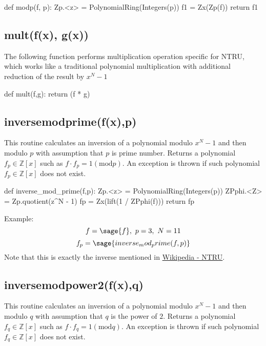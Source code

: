 \documentclass{article}
\begin{document}
\begin{sageblock}
def modp(f, p):
    Zp.<z> = PolynomialRing(Integers(p))
    f1 = Zx(Zp(f))
    return f1
\end{sageblock}


\subsection{mult(f(x), g(x))}
The following function performs multiplication operation specific for NTRU, which works like a traditional polynomial multiplication with additional reduction of the result by $x^N-1$
\begin{sageblock}
def mult(f,g):
    return (f * g) %
\end{sageblock}



\subsection{inverse\textunderscore mod\textunderscore prime(f(x),p)}
This routine calculates an inversion of a polynomial modulo $x^N-1$ 
and then modulo $p$ with assumption that $p$ is prime number.
Returns a polynomial $f_p\in\mathbb{Z}[x]$ such as $f\cdot f_p = 1(\mathrm{mod} p).$
An exception is thrown if such polynomial $f_p\in\mathbb{Z}[x]$ does not exist.



\begin{sageblock}
def inverse_mod_prime(f,p):
    Zp.<z> = PolynomialRing(Integers(p))
    ZPphi.<Z> = Zp.quotient(z^N - 1)
    fp = Zx(lift(1 / ZPphi(f)))
    return fp
\end{sageblock}


Example:
\[
f=\sage{f}, \ p=3, \ N=11
\]
\[
f_p=\sage{inverse_mod_prime(f,p)}
\]
Note that this is exactly the inverse mentioned in \href{https://en.wikipedia.org/wiki/NTRUEncrypt}{Wikipedia - NTRU}.




\subsection{inverse\textunderscore mod\textunderscore power2(f(x),q)}
This routine calculates an inversion of a polynomial modulo $x^N-1$
and then modulo $q$ with assumption that $q$ is the power of $2$.
Returns a polynomial $f_q\in\mathbb{Z}[x]$ such as $f\cdot f_q = 1(\mathrm{mod} q).$
An exception is thrown if such polynomial $f_q\in\mathbb{Z}[x]$ does not exist.
\end{document}
